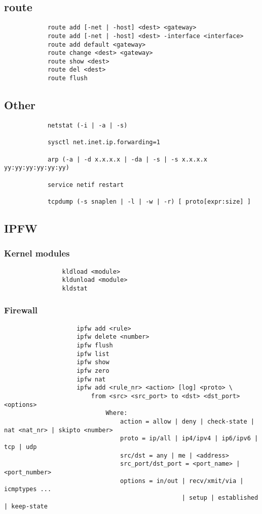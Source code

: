 \documentclass[a4paper, 12pt]{article}
\begin{document}
	\subsection{route}
		\begin{verbatim}
			route add [-net | -host] <dest> <gateway>
			route add [-net | -host] <dest> -interface <interface>		    
			route add default <gateway>
			route change <dest> <gateway>
			route show <dest>
			route del <dest>
			route flush
		\end{verbatim}
	
	\subsection{Other}
		\begin{verbatim}
			netstat (-i | -a | -s) 
		
			sysctl net.inet.ip.forwarding=1
			
			arp (-a | -d x.x.x.x | -da | -s | -s x.x.x.x yy:yy:yy:yy:yy:yy)
							
			service netif restart 
					
			tcpdump (-s snaplen | -l | -w | -r) [ proto[expr:size] ]
		\end{verbatim}
	
	\subsection{IPFW}
		\subsubsection{Kernel modules}
			\begin{verbatim}
				kldload <module>
				kldunload <module>
				kldstat
			\end{verbatim}
			
		\subsubsection{Firewall}
			\begin{verbatim}
					ipfw add <rule>
					ipfw delete <number>
					ipfw flush
					ipfw list
					ipfw show
					ipfw zero
					ipfw nat
					ipfw add <rule_nr> <action> [log] <proto> \ 
					    from <src> <src_port> to <dst> <dst_port> <options>
					        Where:
					            action = allow | deny | check-state | nat <nat_nr> | skipto <number> 
					            proto = ip/all | ip4/ipv4 | ip6/ipv6 | tcp | udp
					            src/dst = any | me | <address>
					            src_port/dst_port = <port_name> | <port_number> 
					            options = in/out | recv/xmit/via | icmptypes ... 
					                             | setup | established | keep-state 
			\end{verbatim}
		
\end{document}
